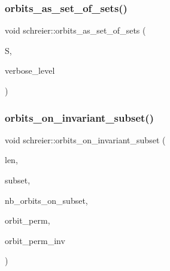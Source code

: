 \subsubsection{\texorpdfstring{orbits\+\_\+as\+\_\+set\+\_\+of\+\_\+sets()}{orbits\_as\_set\_of\_sets()}}
{\footnotesize\ttfamily void schreier\+::orbits\+\_\+as\+\_\+set\+\_\+of\+\_\+sets (\begin{DoxyParamCaption}\item[{\mbox{\hyperlink{classset__of__sets}{set\+\_\+of\+\_\+sets}} $\ast$\&}]{S,  }\item[{\mbox{\hyperlink{galois_8h_a09fddde158a3a20bd2dcadb609de11dc}{I\+NT}}}]{verbose\+\_\+level }\end{DoxyParamCaption})}

\mbox{\label{classschreier_a852787d7b3448fd7c05b481b9ee95bdc}} 
\subsubsection{\texorpdfstring{orbits\+\_\+on\+\_\+invariant\+\_\+subset()}{orbits\_on\_invariant\_subset()}}
{\footnotesize\ttfamily void schreier\+::orbits\+\_\+on\+\_\+invariant\+\_\+subset (\begin{DoxyParamCaption}\item[{\mbox{\hyperlink{galois_8h_a09fddde158a3a20bd2dcadb609de11dc}{I\+NT}}}]{len,  }\item[{\mbox{\hyperlink{galois_8h_a09fddde158a3a20bd2dcadb609de11dc}{I\+NT}} $\ast$}]{subset,  }\item[{\mbox{\hyperlink{galois_8h_a09fddde158a3a20bd2dcadb609de11dc}{I\+NT}} \&}]{nb\+\_\+orbits\+\_\+on\+\_\+subset,  }\item[{\mbox{\hyperlink{galois_8h_a09fddde158a3a20bd2dcadb609de11dc}{I\+NT}} $\ast$\&}]{orbit\+\_\+perm,  }\item[{\mbox{\hyperlink{galois_8h_a09fddde158a3a20bd2dcadb609de11dc}{I\+NT}} $\ast$\&}]{orbit\+\_\+perm\+\_\+inv }\end{DoxyParamCaption})}

\mbox{\label{classschreier_ada89df0b995b15f149a9aa3b2f571861}} 
